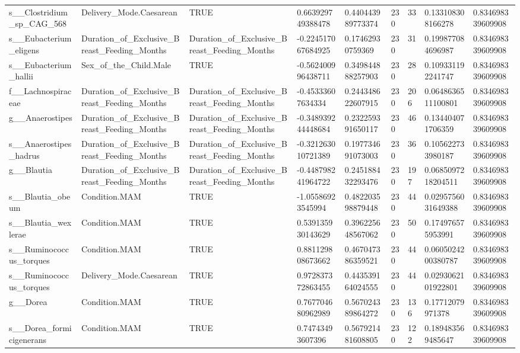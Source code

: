 \begin{longtable}{lllllllll}
s\_\_Clostridium\_sp\_CAG\_568 & Delivery\_Mode.Caesarean & TRUE & 0.663929749388478 & 0.440443989773374 & 230 & 33 & 0.133108308166278 & 0.834698339609908 \\
s\_\_Eubacterium\_eligens & Duration\_of\_Exclusive\_Breast\_Feeding\_Months & Duration\_of\_Exclusive\_Breast\_Feeding\_Months & -0.224517067684925 & 0.17462930759369 & 230 & 31 & 0.199877084696987 & 0.834698339609908 \\
s\_\_Eubacterium\_hallii & Sex\_of\_the\_Child.Male & TRUE & -0.562400996438711 & 0.349844888257903 & 230 & 28 & 0.109331192241747 & 0.834698339609908 \\
f\_\_Lachnospiraceae & Duration\_of\_Exclusive\_Breast\_Feeding\_Months & Duration\_of\_Exclusive\_Breast\_Feeding\_Months & -0.45333607634334 & 0.244348622607915 & 230 & 206 & 0.0648636511100801 & 0.834698339609908 \\
g\_\_Anaerostipes & Duration\_of\_Exclusive\_Breast\_Feeding\_Months & Duration\_of\_Exclusive\_Breast\_Feeding\_Months & -0.348939244448684 & 0.232259391650117 & 230 & 46 & 0.134404071706359 & 0.834698339609908 \\
s\_\_Anaerostipes\_hadrus & Duration\_of\_Exclusive\_Breast\_Feeding\_Months & Duration\_of\_Exclusive\_Breast\_Feeding\_Months & -0.321263010721389 & 0.197734691073003 & 230 & 36 & 0.105622733980187 & 0.834698339609908 \\
g\_\_Blautia & Duration\_of\_Exclusive\_Breast\_Feeding\_Months & Duration\_of\_Exclusive\_Breast\_Feeding\_Months & -0.448798241964722 & 0.245188432293476 & 230 & 197 & 0.0685097218204511 & 0.834698339609908 \\
s\_\_Blautia\_obeum & Condition.MAM & TRUE & -1.05586923545994 & 0.482203598879448 & 230 & 44 & 0.0295756031649388 & 0.834698339609908 \\
s\_\_Blautia\_wexlerae & Condition.MAM & TRUE & 0.539135930143629 & 0.396225648567062 & 230 & 50 & 0.174976575953991 & 0.834698339609908 \\
s\_\_Ruminococcus\_torques & Condition.MAM & TRUE & 0.881129808673662 & 0.467047386359521 & 230 & 44 & 0.0605024200380787 & 0.834698339609908 \\
s\_\_Ruminococcus\_torques & Delivery\_Mode.Caesarean & TRUE & 0.972837372863455 & 0.443539164024555 & 230 & 44 & 0.0293062101922801 & 0.834698339609908 \\
g\_\_Dorea & Condition.MAM & TRUE & 0.767704680962989 & 0.567024389864272 & 230 & 136 & 0.17712079971378 & 0.834698339609908 \\
s\_\_Dorea\_formicigenerans & Condition.MAM & TRUE & 0.74743493607396 & 0.567921481608805 & 230 & 122 & 0.189483569485647 & 0.834698339609908 \\

\end{longtable}
